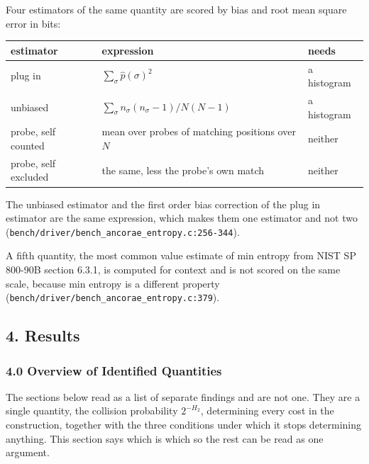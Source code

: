 Four estimators of the same quantity are scored by bias and root mean square error in bits:

\tiny
\setlength{\tabcolsep}{2pt}
\begin{longtable}{@{}>{\raggedright\arraybackslash}p{}>{\raggedright\arraybackslash}p{}>{\raggedright\arraybackslash}p{}@{}}
\toprule
estimator & expression & needs \\
\midrule
plug in & \(\sum_\sigma \hat p(\sigma)^2\) & a histogram \\
unbiased & \(\sum_\sigma n_\sigma(n_\sigma-1) / N(N-1)\) & a histogram \\
probe, self counted & mean over probes of matching positions over \(N\) & neither \\
probe, self excluded & the same, less the probe's own match & neither \\
\bottomrule
\end{longtable}
\normalsize

The unbiased estimator and the first order bias correction of the plug in estimator are the same expression, which makes them one estimator and not two (\texttt{bench/\allowbreak{}driver/\allowbreak{}bench\_\allowbreak{}ancorae\_\allowbreak{}entropy.\allowbreak{}c:256-\allowbreak{}344}).

A fifth quantity, the most common value estimate of min entropy from NIST SP 800-90B section 6.3.1, is computed for context and is not scored on the same scale, because min entropy is a different property (\texttt{bench/\allowbreak{}driver/\allowbreak{}bench\_\allowbreak{}ancorae\_\allowbreak{}entropy.\allowbreak{}c:379}).

\subsection{4. Results}

\subsubsection{4.0 Overview of Identified Quantities}

The sections below read as a list of separate findings and are not one. They are a single quantity, the collision probability \(2^{-H_2}\), determining every cost in the construction, together with the three conditions under which it stops determining anything. This section says which is which so the rest can be read as one argument.

